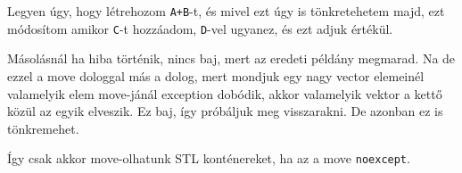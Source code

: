 \documentclass[a4paper,11.5pt]{article}
\begin{document}
		Legyen úgy, hogy létrehozom \texttt{A+B}-t, és mivel ezt úgy is tönkretehetem majd, ezt módosítom amikor \texttt{C}-t hozzáadom, \texttt{D}-vel ugyanez, és ezt adjuk értékül.
		
		Másolásnál ha hiba történik, nincs baj, mert az eredeti példány megmarad. Na de ezzel a move dologgal más a dolog, mert mondjuk egy nagy vector elemeinél valamelyik elem move-jánál exception dobódik, akkor valamelyik vektor a kettő közül az egyik elveszik. Ez baj, így próbáljuk meg visszarakni. De azonban ez is tönkremehet. 
		
		Így csak akkor move-olhatunk STL konténereket, ha az a move \texttt{noexcept}.
		
		
\end{document}
